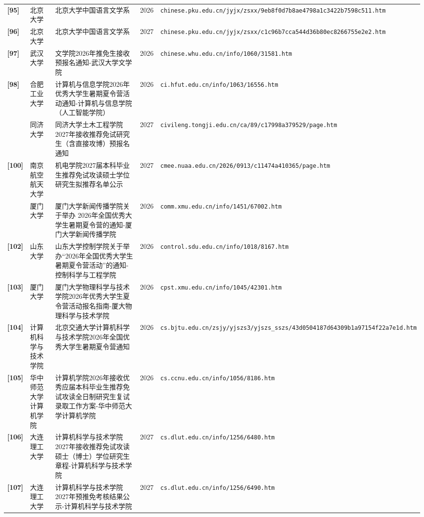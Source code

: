 {\begin{longtable}{@{}p{1.15cm}p{2.9cm}p{6.3cm}p{0.85cm}p{5.0cm}@{}}
\textbf{[95]} & 北京大学 & 北京大学中国语言文学系 & 2026 & \texttt{chinese.pku.edu.cn/jyjx/zsxx/9eb8f0d7b8ae4798a1c3422b7598c511.htm} \\
\textbf{[96]} & 北京大学 & 北京大学中国语言文学系 & 2027 & \texttt{chinese.pku.edu.cn/jyjx/zsxx/c1c96b7cca544d36b80ec8266755e2e2.htm} \\
\textbf{[97]} & 武汉大学 & 文学院2026年推免生接收预报名通知-武汉大学文学院 & 2026 & \texttt{chinese.whu.edu.cn/info/1060/31581.htm} \\
\textbf{[98]} & 合肥工业大学 & 计算机与信息学院2026年优秀大学生暑期夏令营活动通知-计算机与信息学院（人工智能学院） & 2026 & \texttt{ci.hfut.edu.cn/info/1063/16556.htm} \\
[99] & 同济大学 & 同济大学土木工程学院2027年接收推荐免试研究生（含直接攻博）预报名通知 & 2027 & \texttt{civileng.tongji.edu.cn/ca/89/c17998a379529/page.htm} \\
\textbf{[100]} & 南京航空航天大学 & 机电学院2027届本科毕业生推荐免试攻读硕士学位研究生拟推荐名单公示 & 2027 & \texttt{cmee.nuaa.edu.cn/2026/0913/c11474a410365/page.htm} \\
[101] & 厦门大学 & 厦门大学新闻传播学院关于举办 2026年全国优秀大学生暑期夏令营的通知-厦门大学新闻传播学院 & 2026 & \texttt{comm.xmu.edu.cn/info/1451/67002.htm} \\
\textbf{[102]} & 山东大学 & 山东大学控制学院关于举办“2026年全国优秀大学生暑期夏令营活动”的通知-控制科学与工程学院 & 2026 & \texttt{control.sdu.edu.cn/info/1018/8167.htm} \\
\textbf{[103]} & 厦门大学 & 厦门大学物理科学与技术学院2026年优秀大学生夏令营活动报名指南-厦大物理科学与技术学院 & 2026 & \texttt{cpst.xmu.edu.cn/info/1045/42301.htm} \\
\textbf{[104]} & 计算机科学与技术学院 & 北京交通大学计算机科学与技术学院2026年全国优秀大学生暑期夏令营通知 & 2026 & \texttt{cs.bjtu.edu.cn/zsjy/yjszs3/yjszs\_sszs/43d0504187d64309b1a97154f22a7e1d.htm} \\
\textbf{[105]} & 华中师范大学计算机学院 & 计算机学院2026年接收优秀应届本科毕业生推荐免试攻读全日制研究生复试录取工作方案-华中师范大学计算机学院 & 2026 & \texttt{cs.ccnu.edu.cn/info/1056/8186.htm} \\
\textbf{[106]} & 大连理工大学 & 计算机科学与技术学院2027年接收推荐免试攻读硕士（博士）学位研究生章程-计算机科学与技术学院 & 2027 & \texttt{cs.dlut.edu.cn/info/1256/6480.htm} \\
\textbf{[107]} & 大连理工大学 & 计算机科学与技术学院2027年预推免考核结果公示-计算机科学与技术学院 & 2027 & \texttt{cs.dlut.edu.cn/info/1256/6490.htm} \\

\end{longtable}}
